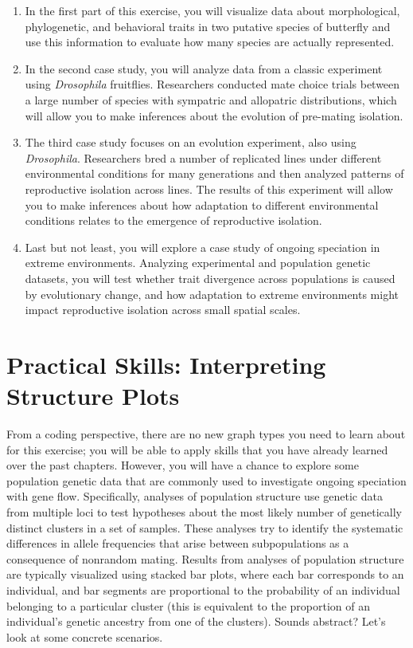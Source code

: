 \documentclass[
]{book}
\begin{document}
\begin{enumerate}
\def\labelenumi{\arabic{enumi}.}
\item
  In the first part of this exercise, you will visualize data about morphological, phylogenetic, and behavioral traits in two putative species of butterfly and use this information to evaluate how many species are actually represented.
\item
  In the second case study, you will analyze data from a classic experiment using \emph{Drosophila} fruitflies. Researchers conducted mate choice trials between a large number of species with sympatric and allopatric distributions, which will allow you to make inferences about the evolution of pre-mating isolation.
\item
  The third case study focuses on an evolution experiment, also using \emph{Drosophila}. Researchers bred a number of replicated lines under different environmental conditions for many generations and then analyzed patterns of reproductive isolation across lines. The results of this experiment will allow you to make inferences about how adaptation to different environmental conditions relates to the emergence of reproductive isolation.
\item
  Last but not least, you will explore a case study of ongoing speciation in extreme environments. Analyzing experimental and population genetic datasets, you will test whether trait divergence across populations is caused by evolutionary change, and how adaptation to extreme environments might impact reproductive isolation across small spatial scales.
\end{enumerate}

\hypertarget{practical-skills-interpreting-structure-plots}{%
\section{Practical Skills: Interpreting Structure Plots}\label{practical-skills-interpreting-structure-plots}}

From a coding perspective, there are no new graph types you need to learn about for this exercise; you will be able to apply skills that you have already learned over the past chapters. However, you will have a chance to explore some population genetic data that are commonly used to investigate ongoing speciation with gene flow. Specifically, analyses of population structure use genetic data from multiple loci to test hypotheses about the most likely number of genetically distinct clusters in a set of samples. These analyses try to identify the systematic differences in allele frequencies that arise between subpopulations as a consequence of nonrandom mating. Results from analyses of population structure are typically visualized using stacked bar plots, where each bar corresponds to an individual, and bar segments are proportional to the probability of an individual belonging to a particular cluster (this is equivalent to the proportion of an individual's genetic ancestry from one of the clusters). Sounds abstract? Let's look at some concrete scenarios.
\end{document}
